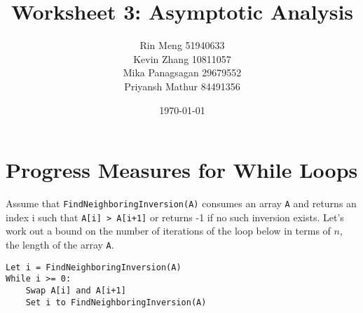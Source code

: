 \documentclass[12pt]{article}
\title{Worksheet 3: Asymptotic Analysis}
\author{Rin Meng 51940633 \\ Kevin Zhang 10811057 \\ Mika Panagsagan 29679552 \\ Priyansh Mathur 84491356}
\date{\today}
\begin{document}
\maketitle

\setcounter{section}{2}

\section{Progress Measures for While Loops}

Assume that \verb|FindNeighboringInversion(A)| consumes an array \verb|A| and 
returns an index i such that \verb|A[i] > A[i+1]| or returns -1 if no such 
inversion exists. Let’s work out a bound on the number of iterations of
the loop below in terms of $n$, the length of the array \verb|A|.
\begin{verbatim}
Let i = FindNeighboringInversion(A)
While i >= 0:
    Swap A[i] and A[i+1]
    Set i to FindNeighboringInversion(A)
\end{verbatim}
\end{document}
